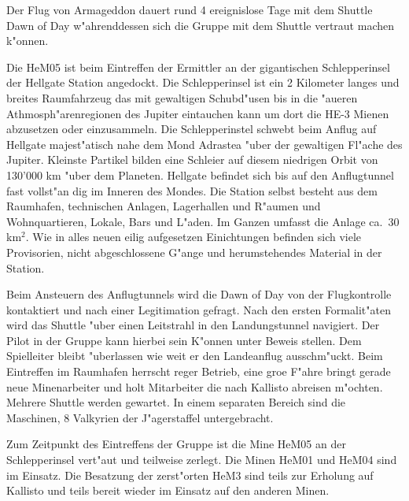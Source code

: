 
Der Flug von Armageddon dauert rund 4 ereignislose Tage  mit dem Shuttle Dawn of Day w"ahrenddessen sich die Gruppe mit dem Shuttle vertraut machen k"onnen. 

Die HeM05 ist beim Eintreffen der Ermittler an der gigantischen Schlepperinsel der Hellgate Station angedockt. Die Schlepperinsel ist ein 2 Kilometer langes und breites Raumfahrzeug das mit gewaltigen Schubd"usen bis in die "au\3eren Athmosph"arenregionen des Jupiter eintauchen kann um dort die HE-3 Mienen abzusetzen oder einzusammeln. Die Schlepperinstel schwebt beim Anflug auf Hellgate majest"atisch nahe dem Mond Adrastea "uber der gewaltigen Fl"ache des Jupiter. Kleinste Partikel bilden eine Schleier auf diesem niedrigen Orbit von 130'000 km "uber dem Planeten. Hellgate befindet sich bis auf den Anflugtunnel fast vollst"an dig im Inneren des Mondes. Die Station selbst besteht aus dem Raumhafen, technischen Anlagen, Lagerhallen und R"aumen und Wohnquartieren, Lokale, Bars und L"aden. Im Ganzen umfasst die Anlage ca.~30 km$^{2}$. Wie in alles neuen eilig aufgesetzen Einichtungen befinden sich viele Provisorien, nicht abgeschlossene G"ange und herumstehendes Material in der Station.

Beim Ansteuern des Anflugtunnels wird die Dawn of Day von der Flugkontrolle kontaktiert und nach einer Legitimation gefragt. Nach den ersten Formalit"aten wird das Shuttle "uber einen Leitstrahl in den Landungstunnel navigiert. Der Pilot in der Gruppe kann hierbei sein K"onnen unter Beweis\3 stellen. Dem Spielleiter bleibt "uberlassen wie weit er den Landeanflug ausschm"uckt. Beim Eintreffen im Raumhafen herrscht reger Betrieb, eine gro\3e F"ahre bringt gerade neue Minenarbeiter und holt Mitarbeiter die nach Kallisto abreisen m"ochten. Mehrere Shuttle werden gewartet. In einem separaten Bereich sind die Maschinen, 8 Valkyrien der J"agerstaffel untergebracht. 

Zum Zeitpunkt des Eintreffens der Gruppe ist die Mine HeM05 an der Schlepperinsel vert"aut und teilweise zerlegt. Die Minen HeM01 und HeM04 sind im Einsatz. Die Besatzung der zerst"orten HeM3 sind teils zur Erholung auf Kallisto und teils bereit wieder im Einsatz auf den anderen Minen.

